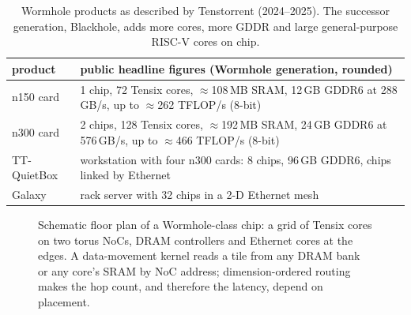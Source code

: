 \begin{table}[t]
\centering\small
\begin{tabularx}{\linewidth}{@{}lX@{}}
\toprule
product & public headline figures (Wormhole generation, rounded)\\
\midrule
n150 card & 1 chip, 72 Tensix cores, $\approx$108\,MB SRAM, 12\,GB GDDR6 at 288\,GB/s, up to $\approx$262 TFLOP/s (8-bit)\\
n300 card & 2 chips, 128 Tensix cores, $\approx$192\,MB SRAM, 24\,GB GDDR6 at 576\,GB/s, up to $\approx$466 TFLOP/s (8-bit)\\
TT-QuietBox & workstation with four n300 cards: 8 chips, 96\,GB GDDR6, chips linked by Ethernet\\
Galaxy & rack server with 32 chips in a 2-D Ethernet mesh\\
\bottomrule
\end{tabularx}
\caption{Wormhole products as described by Tenstorrent (2024--2025). The successor generation,
Blackhole, adds more cores, more GDDR and large general-purpose RISC-V cores on chip.}
\label{tab:accel:tt}
\end{table}

\begin{figure}[t]
\centering
{}
\caption{Schematic floor plan of a Wormhole-class chip: a grid of Tensix cores on two torus NoCs,
DRAM controllers and Ethernet cores at the edges. A data-movement kernel reads a tile from any
DRAM bank or any core's SRAM by NoC address; dimension-ordered routing makes the hop count, and
therefore the latency, depend on placement.}
\label{fig:accel:wormhole}
\end{figure}

